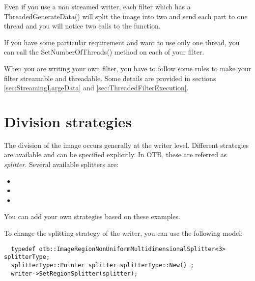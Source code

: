 Even if you use a non streamed writer, each filter which has a
ThreadedGenerateData() will split the image into two and send each part to one
thread and you will notice two calls to the function.

If you have some particular requirement and want to use only one thread, you can
call the SetNumberOfThreads() method on each of your filter. 

When you are writing your own filter, you have to follow some rules to make your
filter streamable and threadable. Some details are provided in sections 
\ref{sec:StreamingLargeData} and \ref{sec:ThreadedFilterExecution}.


\section{Division strategies}\label{sec:Splitters}
%

The division of the image occurs generally at the writer level. Different 
strategies are available and can be specified explicitly. In OTB, these are 
referred as {\em splitter}. Several available splitters are:

\begin{itemize}
\item {}
\item {}
\item {}
\end{itemize}

You can add your own strategies based on these examples.

To change the splitting strategy of the writer, you can use the following model:

\begin{verbatim}
  typedef otb::ImageRegionNonUniformMultidimensionalSplitter<3> splitterType;
  splitterType::Pointer splitter=splitterType::New() ;
  writer->SetRegionSplitter(splitter);
\end{verbatim}


